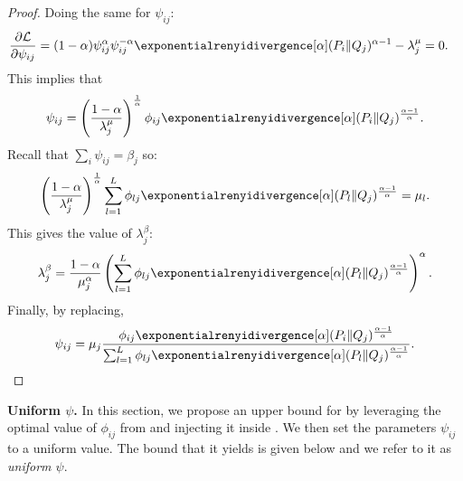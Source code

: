 \begin{proof}
    Doing the same for $\psi_{ij}$:
    \begin{align*}
        \frac{\partial \mathcal{L}}{\partial \psi_{ij}} &= (1-\alpha) \psi_{ij}^{\alpha} \psi_{ij}^{-\alpha} \exponentialrenyidivergence[\alpha] (P_i\Vert Q_j)^{\alpha-1}-\lambda_j^{\mu} = 0.
    \end{align*}
    This implies that 
    \begin{align*}
        \psi_{ij} = \left(\frac{1-\alpha}{\lambda_j^{\mu}}\right)^{\frac{1}{\alpha}}\phi_{ij}\exponentialrenyidivergence[\alpha](P_i\Vert Q_j)^{\frac{\alpha-1}{\alpha}}.
    \end{align*}
    Recall that $\sum_{i}\psi_{ij}=\beta_j$ so:
    \begin{align*}
        \left(\frac{1-\alpha}{\lambda_j^{\mu}}\right)^{\frac{1}{\alpha}} \sum_{l=1}^L \phi_{lj}\exponentialrenyidivergence[\alpha](P_l\Vert Q_j)^{\frac{\alpha-1}{\alpha}} = \mu_l.
    \end{align*}
    This gives the value of $\lambda_j^{\beta}$:
    \begin{align*}
        \lambda_j^{\beta} = \frac{1-\alpha}{\mu_j^\alpha}\left(\sum_{l=1}^L \phi_{lj}\exponentialrenyidivergence[\alpha](P_l\Vert Q_j)^{\frac{\alpha-1}{\alpha}}\right)^\alpha .
    \end{align*}
    Finally, by replacing,
    \begin{align*}
        \psi_{ij} = \mu_j \frac{\phi_{ij}\exponentialrenyidivergence[\alpha](P_i\Vert Q_j)^{\frac{\alpha-1}{\alpha}}}{\sum_{l=1}^L \phi_{lj}\exponentialrenyidivergence[\alpha](P_l\Vert Q_j)^{\frac{\alpha-1}{\alpha}}}.
    \end{align*}
\end{proof}


\textbf{Uniform $\psi$.}
In this section, we propose an upper bound for  by leveraging the optimal value of $\phi_{ij}$ from  and injecting it inside . We then set the parameters $\psi_{ij}$ to a uniform value. 
The bound that it yields is given below and we refer to it as \textit{uniform $\psi$}. 

